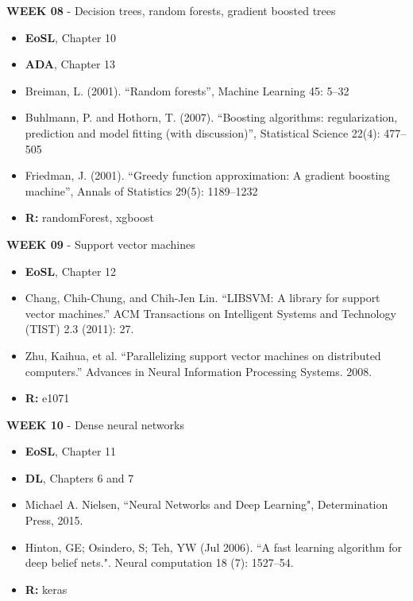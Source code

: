 \documentclass[12pt]{article}
\begin{document}
\vspace{0.2cm}

\textbf{WEEK 08} - Decision trees, random forests, gradient boosted trees

\begin{itemize}\setlength\itemsep{0em}
\item \textbf{EoSL}, Chapter 10
\item \textbf{ADA}, Chapter 13
\item Breiman, L. (2001). ``Random forests'', Machine Learning 45: 5–32
\item Buhlmann, P. and Hothorn, T. (2007). ``Boosting algorithms: regularization, prediction and model fitting (with discussion)'', Statistical Science 22(4): 477–505
\item Friedman, J. (2001). ``Greedy function approximation: A gradient boosting machine'', Annals of Statistics 29(5): 1189–1232
\item \textbf{R:} randomForest, xgboost
\end{itemize}

\vspace{0.2cm}

\textbf{WEEK 09} - Support vector machines

\begin{itemize}\setlength\itemsep{0em}
\item \textbf{EoSL}, Chapter 12
\item Chang, Chih-Chung, and Chih-Jen Lin. ``LIBSVM: A library for support vector machines.''
ACM Transactions on Intelligent Systems and Technology (TIST) 2.3 (2011): 27.
\item Zhu, Kaihua, et al. ``Parallelizing support vector machines on distributed computers.''
Advances in Neural Information Processing Systems. 2008.
\item \textbf{R:} e1071
\end{itemize}

\vspace{0.2cm}

\textbf{WEEK 10} - Dense neural networks

\begin{itemize}\setlength\itemsep{0em}
\item \textbf{EoSL}, Chapter 11
\item \textbf{DL}, Chapters 6 and 7
\item Michael A. Nielsen, ``Neural Networks and Deep Learning", Determination Press, 2015.
\item Hinton, GE; Osindero, S; Teh, YW (Jul 2006). ``A fast learning algorithm for deep
belief nets.". Neural computation 18 (7): 1527–54.
\item \textbf{R:} keras
\end{itemize}
\end{document}
